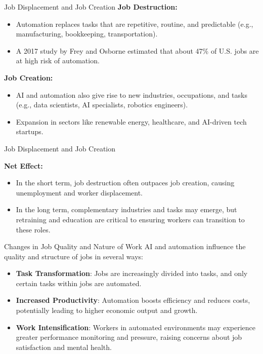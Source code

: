\documentclass{beamer}
\begin{document}
\begin{frame}{Job Displacement and Job Creation}
\textbf{Job Destruction:}
\begin{itemize}
    \item Automation replaces tasks that are repetitive, routine, and predictable (e.g., manufacturing, bookkeeping, transportation).
    \item A 2017 study by Frey and Osborne estimated that about 47\% of U.S. jobs are at high risk of automation.
\end{itemize}
\vspace{0.5cm}
\textbf{Job Creation:}
\begin{itemize}
    \item AI and automation also give rise to new industries, occupations, and tasks (e.g., data scientists, AI specialists, robotics engineers).
    \item Expansion in sectors like renewable energy, healthcare, and AI-driven tech startups.
\end{itemize}
\end{frame}




\begin{frame}{Job Displacement and Job Creation}

\textbf{Net Effect:}
\begin{itemize}
    \item In the short term, job destruction often outpaces job creation, causing unemployment and worker displacement.
    \item In the long term, complementary industries and tasks may emerge, but retraining and education are critical to ensuring workers can transition to these roles.
\end{itemize}
\end{frame}





\begin{frame}{Changes in Job Quality and Nature of Work}
AI and automation influence the quality and structure of jobs in several ways:

\begin{itemize}
    \item \textbf{Task Transformation}: Jobs are increasingly divided into tasks, and only certain tasks within jobs are automated.
    \vspace{0.5cm}
    \item \textbf{Increased Productivity}: Automation boosts efficiency and reduces costs, potentially leading to higher economic output and growth.
  \vspace{0.5cm}
    \item \textbf{Work Intensification}: Workers in automated environments may experience greater performance monitoring and pressure, raising concerns about job satisfaction and mental health.
\end{itemize}
\end{frame}
\end{document}
